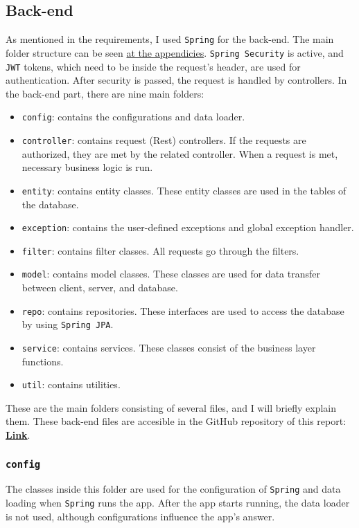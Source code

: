 \subsection{Back-end}

As mentioned in the requirements, I used \texttt{Spring} for the back-end. The main folder structure can be seen \hyperref[back-end-tree]{at the appendicies}. \texttt{Spring Security} is active, and \texttt{JWT} tokens, which need to be inside the request's header, are used for authentication. After security is passed, the request is handled by controllers. In the back-end part, there are nine main folders:
\begin{itemize}
  \item \texttt{config}: contains the configurations and data loader.
  \item \texttt{controller}: contains request (Rest) controllers. If the requests are authorized, they are met by the related controller. When a request is met, necessary business logic is run.
  \item \texttt{entity}: contains entity classes. These entity classes are used in the tables of the database.
  \item \texttt{exception}: contains the user-defined exceptions and global exception handler.
  \item \texttt{filter}: contains filter classes. All requests go through the filters.
  \item \texttt{model}: contains model classes. These classes are used for data transfer between client, server, and database.
  \item \texttt{repo}: contains repositories. These interfaces are used to access the database by using \texttt{Spring JPA}.
  \item \texttt{service}: contains services. These classes consist of the business layer functions.
  \item \texttt{util}: contains utilities.
\end{itemize}
These are the main folders consisting of several files, and I will briefly explain them. These back-end files are accesible in the GitHub repository of this report: \href{https://github.com/burakmetehan/internship-report-2022}{\textbf{Link}}.
\newpage


\subsubsection{\texttt{config}}

The classes inside this folder are used for the configuration of \texttt{Spring} and data loading when \texttt{Spring} runs the app. After the app starts running, the data loader is not used, although configurations influence the app's answer.

